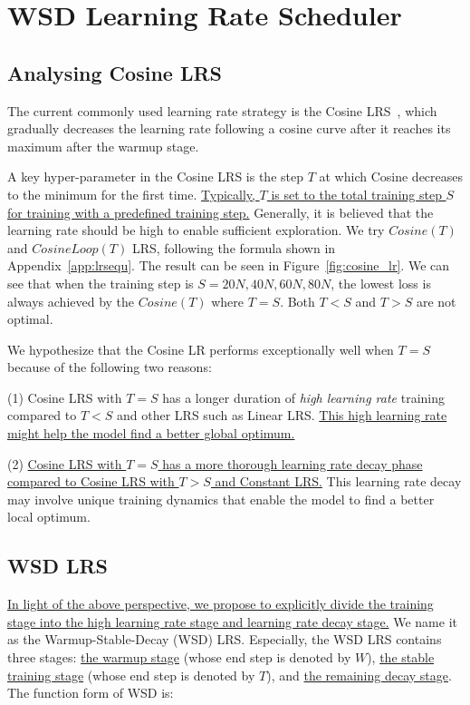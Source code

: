 \section{WSD Learning Rate Scheduler}
\label{sec:wsdlrs}
\subsection{Analysing Cosine LRS}

The current commonly used learning rate strategy is the Cosine LRS~\citep{kaplan2020scaling, hoffmann2022training, rae2021scaling, touvron2023llama, bai2023qwen, almazrouei2023falcon}, which gradually decreases the learning rate following a cosine curve after it reaches its maximum after the warmup stage. 

A key hyper-parameter in the Cosine LRS is the step $T$ at which Cosine decreases to the minimum for the first time. \uline{Typically, $T$ is set to the total training step $S$ for training with a predefined training step.} Generally, it is believed that the learning rate should be high to enable sufficient exploration. We try $Cosine(T)$ and $CosineLoop(T)$ LRS, following the formula shown in Appendix~\ref{app:lrsequ}. The result can be seen in Figure~\ref{fig:cosine_lr}. We can see that when the training step is $S=20N, 40N, 60N, 80N$, the lowest loss is always achieved by the $Cosine(T)$ where $T = S$. Both $T<S$ and $T>S$ are not optimal. 

We hypothesize that the Cosine LR performs exceptionally well when $T = S$ because of the following two reasons: 

(1) Cosine LRS with $T = S$ has a longer duration of \textit{high learning rate} training compared to $T < S$ and other LRS such as Linear LRS. \uline{This high learning rate might help the model find a better global optimum.}

(2) \uline{Cosine LRS with $T = S$ has a more thorough learning rate decay phase compared to Cosine LRS with $T > S$ and Constant LRS.} This learning rate decay may involve unique training dynamics that enable the model to find a better local optimum.

\subsection{WSD LRS}

\uline{In light of the above perspective, we propose to explicitly divide the training stage into the high learning rate stage and learning rate decay stage.} We name it as the Warmup-Stable-Decay (WSD) LRS.  Especially, the WSD LRS contains three stages: \uline{the warmup stage} (whose end step is denoted by $W$), \uline{the stable training stage} (whose end step is denoted by $T$), and \uline{the remaining decay stage}. The function form of WSD is:


